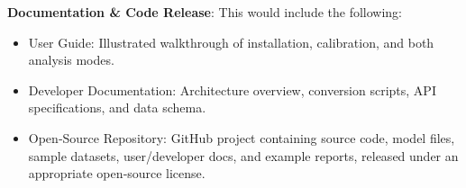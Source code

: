 \documentclass[project-plan]{report-template}
\begin{document}
\textbf{Documentation \& Code Release}: This would include the following:

\begin{itemize}
    \item User Guide: Illustrated walkthrough of installation, calibration, and both analysis modes.
\end{itemize}

\begin{itemize}
    \item Developer Documentation: Architecture overview, conversion scripts, API specifications, and data schema.
\end{itemize}

\begin{itemize}
    \item Open‐Source Repository: GitHub project containing source code, model files, sample datasets, user/developer docs, and example reports, released under an appropriate open‐source license.
\end{itemize}
\end{document}
